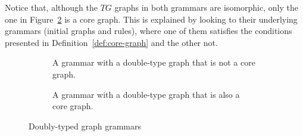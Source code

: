 \begin{example}
  Notice that, although the $TG$ graphs in both grammars are isomorphic, only the one in Figure~\ref{fig:process:core-graph:example} is a core graph. This is explained by looking to their underlying grammars (initial graphs and rules), where one of them satisfies the conditions presented in Definition~\ref{def:core-graph} and the other not.
\begin{figure}[!ht]
  \centering
  \begin{subfigure}[t]{.5\textwidth}
    \centerline{}
    \caption{A grammar with a double-type graph that is not a core graph.}\label{fig:process:core-graph:counter-example}
  \end{subfigure}
  \begin{subfigure}[t]{.5\textwidth}
    \centerline{}
    \caption{A grammar with a double-type graph that is also a core graph.}\label{fig:process:core-graph:example}
  \end{subfigure}

  \caption{Doubly-typed graph grammars}\label{fig:process:doubly-typed-grammars}
\end{figure}

\end{example}

